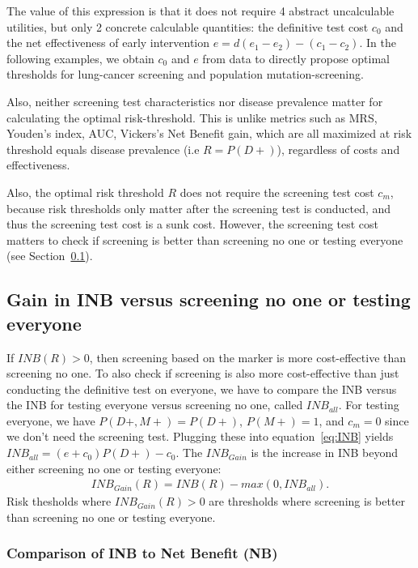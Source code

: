 \documentclass[11pt, letterpaper]{article}
\begin{document}
The value of this expression is that it does not require 4 abstract uncalculable utilities, but only 2 concrete calculable quantities: the definitive test cost $c_0$ and the net effectiveness of early intervention $e=d(e_1-e_2)-(c_1-c_2)$.  In the following examples, we obtain $c_0$ and $e$ from data to directly propose optimal thresholds for lung-cancer screening and population mutation-screening.

Also, neither screening test characteristics nor disease prevalence matter for calculating the optimal risk-threshold.  This is unlike metrics such as MRS, Youden's index, AUC, Vickers's Net Benefit gain, which are all maximized at risk threshold equals disease prevalence (i.e $R=P(D+)$), regardless of costs and effectiveness. 

Also, the optimal risk threshold $R$ does not require the screening test cost $c_m$, because risk thresholds only matter after the screening test is conducted, and thus the screening test cost is a sunk cost.  However, the screening test cost matters to check if screening is better than screening no one or testing everyone (see Section~\ref{sec:INBgain}).  




\subsection{Gain in INB  versus screening no one or testing everyone}
\label{sec:INBgain}

If $INB(R)>0$, then screening based on the marker is more cost-effective than screening no one.  To also check if screening is also more cost-effective than just conducting the definitive test on everyone, we have to compare the INB versus the INB for testing everyone versus screening no one, called $INB_{all}$.   For testing everyone, we have $P(D+,M+)=P(D+)$, $P(M+)=1$, and $c_m=0$ since we don't need the screening test.  Plugging these into equation~\ref{eq:INB} yields $INB_{all}=(e+c_0)P(D+)-c_0$.  The $INB_{Gain}$ is the increase in INB beyond either screening no one or testing everyone:
\begin{eqnarray}
INB_{Gain}(R) = INB(R) - max(0,INB_{all}).
\end{eqnarray}
Risk thesholds where $INB_{Gain}(R)>0$ are thresholds where screening is better than screening no one or testing everyone.

\subsubsection{Comparison of INB to Net Benefit (NB)}
\label{sec:NB}
\end{document}
